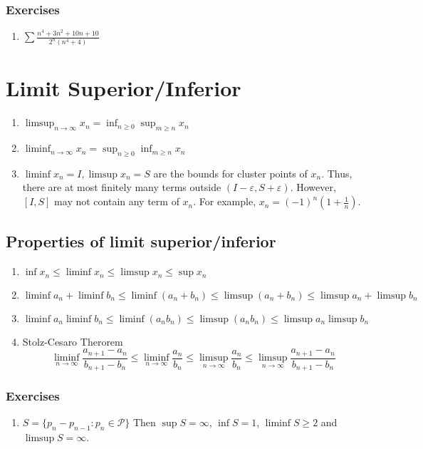 \subsubsection*{Exercises} %
\begin{enumerate}
	\item $\sum \frac{n^4+3n^2+10n+10}{2^n(n^4+4)}$
\end{enumerate}


\section{Limit Superior/Inferior}
\begin{enumerate}
	\item $\displaystyle \limsup_{n \to \infty} x_n = \inf_{n \ge 0} \sup_{m \ge n} x_n $
	\item $ \displaystyle \liminf_{n \to \infty} x_n = \sup_{n \ge 0} \inf_{m \ge n} x_n $
	\item $\liminf x_n  = I,\limsup x_n = S$ are the bounds for cluster points of $x_n$.
	Thus, there are at most finitely many terms outside $(I-\varepsilon,S+\varepsilon)$.
	However, $[I,S]$ may not contain any term of $x_n$.
	For example, $x_n = (-1)^n (1+\frac{1}{n})$.
\end{enumerate}

\subsection{Properties of limit superior/inferior}
\begin{enumerate}
	\item $\inf x_n \le \liminf x_n \le \limsup x_n \le \sup x_n $
	\item $ \liminf a_n + \liminf b_n \le \liminf (a_n+b_n) \le \limsup (a_n + b_n) \le \limsup a_n + \limsup b_n $ 
	\item $ \liminf a_n \liminf b_n \le \liminf (a_n b_n) \le \limsup (a_n b_n) \le \limsup a_n \limsup b_n  $
	\item Stolz-Cesaro Therorem
		\[ \liminf_{n \to \infty} \frac{a_{n+1}-a_n}{b_{n+1}-b_n} \le \liminf_{n \to \infty} \frac{a_n}{b_n} \le \limsup_{n \to \infty} \frac{a_n}{b_n} \le \limsup_{n \to \infty} \frac{a_{n+1}-a_n}{b_{n+1}-b_n} \]
\end{enumerate}

\subsubsection*{Exercises} %
\begin{enumerate}
	\item $S = \{ p_n - p_{n-1} : p_n \in \mathscr{P} \}$ Then $\sup S = \infty$, $\inf S = 1$, $\liminf S \ge 2$ and $\limsup S = \infty$.
\end{enumerate}

